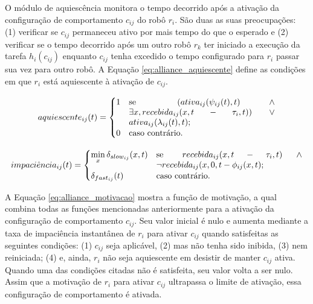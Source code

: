         O módulo de aquiescência monitora o tempo decorrido após a ativação da configuração de comportamento $c_{ij}$ do robô $r_i$. São duas as suas preocupações: (1) verificar se $c_{ij}$ permaneceu ativo por mais tempo do que o esperado e (2) verificar se o tempo decorrido após um outro robô $r_k$ ter iniciado a execução da tarefa $h_i(c_{ij})$ enquanto $c_{ij}$ tenha excedido o tempo configurado para $r_i$ passar sua vez para outro robô. A Equação \ref{eq:alliance_aquiescente} define as condições em que $r_i$ está aquiescente à ativação de $c_{ij}$.
        
        \begin{equation} \label{eq:alliance_aquiescente}
            aquiescente_{ij}(t) =
            \begin{cases}
                1 & \parbox[t]{.5\textwidth}{se $(ativa_{ij}(\psi_{ij}(t), t) \,\land\, \exists x, recebida_{ij}(x, t - \tau_i, t)) \,\lor\, ativa_{ij}(\lambda_{ij}(t), t)$;} \\
                0 & \text{caso contrário.}
            \end{cases}
        \end{equation}
        
        \begin{equation} \label{eq:alliance_impaciencia}
            impaci\hat{e}ncia_{ij}(t) =
            \begin{cases}
                \min\limits_{x}\delta_{slow_{ij}}(x, t) & \parbox[t]{.5\textwidth}{se $recebida_{ij}(x, t - \tau_i, t) \,\land\, \lnot recebida_{ij}(x, 0, t - \phi_{ij}(x, t)$;} \\
                \delta_{fast_{ij}}(t) & \text{caso contrário.}
            \end{cases}
        \end{equation}
        
        A Equação \ref{eq:alliance_motivacao} mostra a função de motivação, a qual combina todas as funções mencionadas anteriormente para a ativação da configuração de comportamento $c_{ij}$. Seu valor inicial é nulo e aumenta mediante a taxa de impaciência instantânea de $r_i$ para ativar $c_{ij}$ quando satisfeitas as seguintes condições: (1) $c_{ij}$ seja aplicável, (2) mas não tenha sido inibida, (3) nem reiniciada; (4) e, ainda, $r_i$ não seja aquiescente em desistir de manter $c_{ij}$ ativa. Quando uma das condições citadas não é satisfeita, seu valor volta a ser nulo. Assim que a motivação de $r_i$ para ativar $c_{ij}$ ultrapassa o limite de ativação, essa configuração de comportamento é ativada.
        
